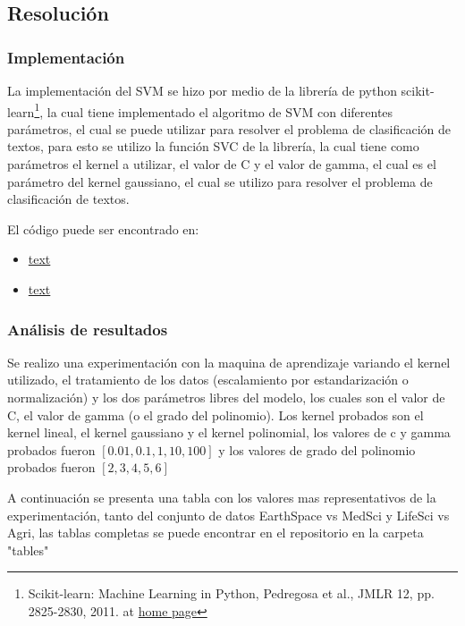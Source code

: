\documentclass{article}
\theoremstyle{mytheoremstyle}
\theoremstyle{mytheoremstyle}
\theoremstyle{myproblemstyle}
\begin{document}
\subsection*{Resolución}

\subsubsection*{Implementación}

La implementación del SVM se hizo por medio de la librería de python scikit-learn\footnote{Scikit-learn: Machine Learning in Python, Pedregosa et al., JMLR 12, pp. 2825-2830, 2011. at \href{https://scikit-learn.org/stable/index.html}{home page} }, la cual tiene implementado el algoritmo de SVM con diferentes parámetros, el cual se puede utilizar para resolver el problema de clasificación de textos, para esto se utilizo la función SVC de la librería, la cual tiene como parámetros el kernel a utilizar, el valor de C y el valor de gamma, el cual es el parámetro del kernel gaussiano, el cual se utilizo para resolver el problema de clasificación de textos.

El código puede ser encontrado en:

\begin{itemize}
  \item \href{}{text}
  \item \href{}{text}
\end{itemize}

\subsubsection*{Análisis de resultados}

Se realizo una experimentación con la maquina de aprendizaje variando el kernel utilizado, el tratamiento de los datos (escalamiento por estandarización o normalización) y los dos parámetros libres del modelo, los cuales son el valor de C, el valor de gamma (o el grado del polinomio). Los kernel probados son el kernel lineal, el kernel gaussiano y el kernel polinomial, los valores de c y gamma probados fueron $[0.01, 0.1, 1, 10, 100]$ y los valores de grado del polinomio probados fueron $[2, 3, 4, 5, 6]$

A continuación se presenta una tabla con los valores mas representativos de la experimentación, tanto del conjunto de datos EarthSpace vs MedSci y LifeSci vs Agri, las tablas completas se puede encontrar en el repositorio en la carpeta "tables"
\end{document}
